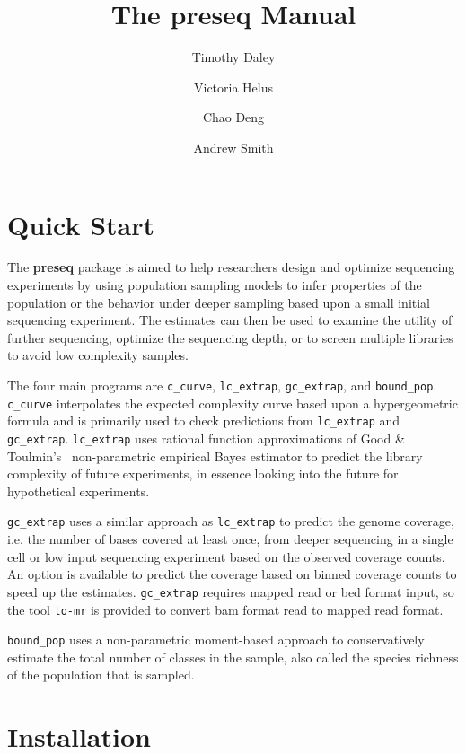 \documentclass[11pt, titlepage]{article}
\title{The \textbf{preseq} Manual}
\author{Timothy Daley \and Victoria Helus \and Chao Deng \and Andrew Smith }
\newcommand{\fn}[1]{\texttt{#1}}
\begin{document}
\maketitle

\tableofcontents

\newpage

\section{Quick Start}
\label{chap:quickstart}

The \textbf{preseq} package is aimed to help researchers design and
optimize sequencing experiments by using population sampling models to
infer properties of the population or the behavior under deeper
sampling based upon a small initial sequencing experiment.  The
estimates can then be used to examine the utility of further
sequencing, optimize the sequencing depth, or to screen multiple
libraries to avoid low complexity samples.

The four main programs are \fn{c\_curve}, \fn{lc\_extrap},
\fn{gc\_extrap}, and \fn{bound\_pop}.  \fn{c\_curve} interpolates the
expected complexity curve based upon a hypergeometric formula and is
primarily used to check predictions from \fn{lc\_extrap} and
\fn{gc\_extrap}.  \fn{lc\_extrap} uses rational function
approximations of Good \& Toulmin's~\cite{good1956number}
non-parametric empirical Bayes estimator to predict the library
complexity of future experiments, in essence looking into the future
for hypothetical experiments.

\fn{gc\_extrap} uses a similar approach as \fn{lc\_extrap} to predict
the genome coverage, i.e. the number of bases covered at least once,
from deeper sequencing in a single cell or low input sequencing
experiment based on the observed coverage counts.  An option is
available to predict the coverage based on binned coverage counts to
speed up the estimates.  \fn{gc\_extrap} requires mapped read or bed
format input, so the tool \fn{to-mr} is provided to convert bam format
read to mapped read format.

\fn{bound\_pop} uses a non-parametric moment-based approach to
conservatively estimate the total number of classes in the sample,
also called the species richness of the population that is sampled.

\newpage

\section{Installation}
\label{sec:install}
\end{document}
